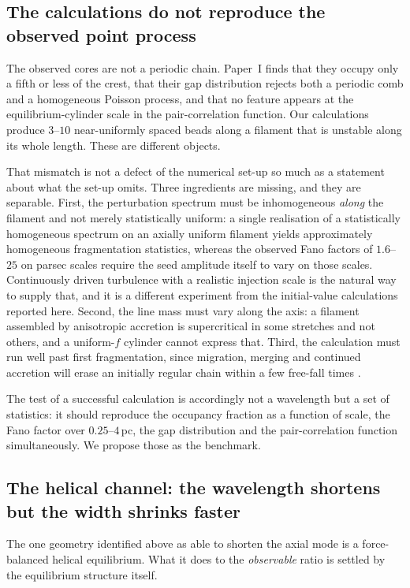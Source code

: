 \documentclass[usenatbib,twoside,twocolumn]{mnras}
\begin{document}
\subsection{The calculations do not reproduce the observed point process}

The observed cores are not a periodic chain. Paper~I finds that they occupy only a fifth or less of the crest, that their gap distribution rejects both a periodic comb and a homogeneous Poisson process, and that no feature appears at the equilibrium-cylinder scale in the pair-correlation function. Our calculations produce $3$--$10$ near-uniformly spaced beads along a filament that is unstable along its whole length. These are different objects.

That mismatch is not a defect of the numerical set-up so much as a statement about what the set-up omits. Three ingredients are missing, and they are separable. First, the perturbation spectrum must be inhomogeneous \emph{along} the filament and not merely statistically uniform: a single realisation of a statistically homogeneous spectrum on an axially uniform filament yields approximately homogeneous fragmentation statistics, whereas the observed Fano factors of $1.6$--$25$ on parsec scales require the seed amplitude itself to vary on those scales. Continuously driven turbulence with a realistic injection scale is the natural way to supply that, and it is a different experiment from the initial-value calculations reported here. Second, the line mass must vary along the axis: a filament assembled by anisotropic accretion is supercritical in some stretches and not others, and a uniform-$f$ cylinder cannot express that. Third, the calculation must run well past first fragmentation, since migration, merging and continued accretion will erase an initially regular chain within a few free-fall times \citep{Clarke2020}.

The test of a successful calculation is accordingly not a wavelength but a set of statistics: it should reproduce the occupancy fraction as a function of scale, the Fano factor over $0.25$--$4$\,pc, the gap distribution and the pair-correlation function simultaneously. We propose those as the benchmark.

\subsection{The helical channel: the wavelength shortens but the width shrinks faster}
\label{sec:helical_result}

The one geometry identified above as able to shorten the axial mode is a force-balanced helical equilibrium. What it does to the \emph{observable} ratio is settled by the equilibrium structure itself.
\end{document}
